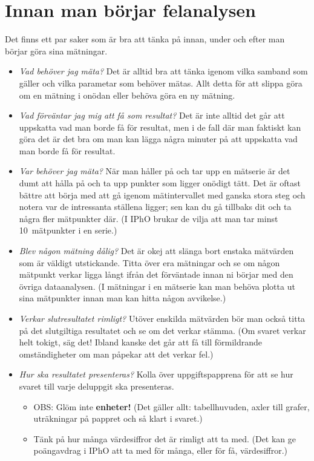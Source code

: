 \documentclass[11pt,a4paper, swedish
]{article}
\begin{document}
\section{Innan man börjar felanalysen}
Det finns ett par saker som är bra att tänka på innan, under och efter
man börjar göra sina mätningar.
\begin{itemize}
\item \emph{Vad behöver jag mäta?} Det är alltid bra att tänka igenom
  vilka samband som gäller och vilka parametar som behöver mätas. Allt
  detta för att slippa göra om en mätning i onödan eller behöva göra
  en ny mätning.
\item \emph{Vad förväntar jag mig att få som resultat?} Det är inte
  alltid det går att uppskatta vad man borde få för resultat, men i de
  fall där man faktiskt kan göra det är det bra om man kan lägga några
  minuter på att uppskatta vad man borde få för resultat. 
\item \emph{Var behöver jag mäta?} När man håller på och tar upp en
  mätserie är det dumt att hålla på och ta upp punkter som ligger
  onödigt tätt. Det är oftast bättre att börja med att gå igenom
  mätintervallet med ganska stora steg och notera var de
  intressanta ställena ligger; sen kan du gå tillbaks dit och ta några
  fler mätpunkter där. (I IPhO brukar de vilja att man tar minst
  10~mätpunkter i en serie.)
\item \emph{Blev någon mätning dålig?} Det är okej att slänga bort
  enstaka mätvärden som är väldigt utstickande. Titta över era
  mätningar och se om någon mätpunkt verkar ligga långt ifrån det
  förväntade innan ni börjar med den övriga dataanalysen. (I mätningar
  i en mätserie kan man behöva plotta ut sina mätpunkter innan man kan
  hitta någon avvikelse.)
\item \emph{Verkar slutresultatet rimligt?} Utöver enskilda mätvärden
  bör man också titta på det slutgiltiga resultatet och se om det
  verkar stämma. (Om svaret verkar helt tokigt, säg det! Ibland kanske
  det går att få till förmildrande omständigheter om man påpekar att
  det verkar fel.)
\item \emph{Hur ska resultatet presenteras?} Kolla över
  uppgiftspapprena för att se hur svaret till varje deluppgit ska
  presenteras.
  \begin{itemize}
  \item OBS: Glöm inte \textbf{enheter!} (Det gäller allt:
  tabellhuvuden, axler till grafer, uträkningar på pappret och så
  klart i svaret.)
  \item Tänk på hur många värdesiffror det är rimligt att ta
    med. (Det kan ge poängavdrag i IPhO att ta med för många, eller
    för få, värdesiffror.)
  \end{itemize}
\end{itemize}
\end{document}
